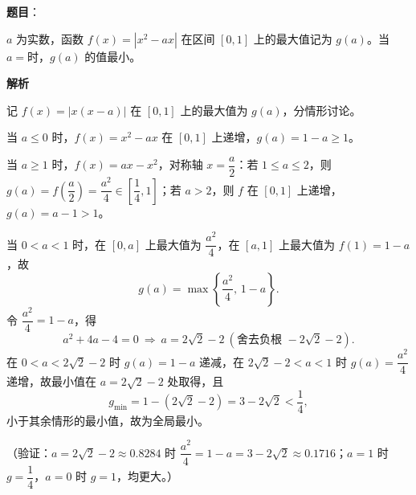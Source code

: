 \begin{answer}

\textbf{题目}：

\(a\) 为实数，函数 \(f(x)=|x^2-ax|\) 在区间 \([0,1]\) 上的最大值记为 \(g(a)\)。当 \(a=\)\gkblank{}时，\(g(a)\) 的值最小。

\textbf{解析}

记 \(f(x)=|x(x-a)|\) 在 \([0,1]\) 上的最大值为 \(g(a)\)，分情形讨论。

当 \(a\leqslant0\) 时，\(f(x)=x^2-ax\) 在 \([0,1]\) 上递增，\(g(a)=1-a\geqslant1\)。

当 \(a\geqslant1\) 时，\(f(x)=ax-x^2\)，对称轴 \(x=\dfrac a2\)：若 \(1\leqslant a\leqslant2\)，则 \(g(a)=f\left(\dfrac a2\right)=\dfrac{a^2}{4}\in\left[\dfrac14,1\right]\)；若 \(a>2\)，则 \(f\) 在 \([0,1]\) 上递增，\(g(a)=a-1>1\)。

当 \(0<a<1\) 时，在 \([0,a]\) 上最大值为 \(\dfrac{a^2}{4}\)，在 \([a,1]\) 上最大值为 \(f(1)=1-a\)，故
\nopagebreak[4]
\[
g(a)=\max\left\{\frac{a^2}{4},\,1-a\right\}.
\]
令 \(\dfrac{a^2}{4}=1-a\)，得
\nopagebreak[4]
\[
a^2+4a-4=0
\ \Longrightarrow\ a=2\sqrt2-2\ (\text{舍去负根 }-2\sqrt2-2).
\]
在 \(0<a<2\sqrt2-2\) 时 \(g(a)=1-a\) 递减，在 \(2\sqrt2-2<a<1\) 时 \(g(a)=\dfrac{a^2}{4}\) 递增，故最小值在 \(a=2\sqrt2-2\) 处取得，且
\nopagebreak[4]
\[
g_{\min}=1-(2\sqrt2-2)=3-2\sqrt2<\frac14,
\]
小于其余情形的最小值，故为全局最小。

（验证：\(a=2\sqrt2-2\approx0.8284\) 时 \(\dfrac{a^2}{4}=1-a=3-2\sqrt2\approx0.1716\)；\(a=1\) 时 \(g=\dfrac14\)，\(a=0\) 时 \(g=1\)，均更大。）


\end{answer}
